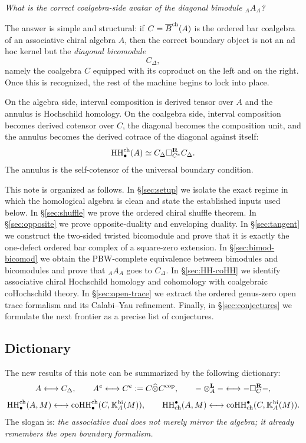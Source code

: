 \medskip

\emph{What is the correct coalgebra-side avatar of the diagonal bimodule ${}_A A_A$?}

\medskip

The answer is simple and structural:
if $C=\overline{B}^{\mathrm{ch}}(A)$ is the ordered bar coalgebra of an associative chiral algebra $A$, then the
correct boundary object is not an ad hoc kernel but the \emph{diagonal bicomodule}
\[
C_\Delta,
\]
namely the coalgebra $C$ equipped with its coproduct on the left and on the right. Once this is
recognized, the rest of the machine begins to lock into place.

On the algebra side, interval composition is derived tensor over $A$ and the annulus is Hochschild
homology. On the coalgebra side, interval composition becomes derived cotensor over $C$, the
diagonal becomes the composition unit, and the annulus becomes the derived cotrace of the diagonal
against itself:
\[
\operatorname{HH}^{\mathrm{ch}}_\bullet(A)\simeq C_\Delta \square_{C^e}^{\mathbf R} C_\Delta.
\]
The annulus is the self-cotensor of the universal boundary condition.

This note is organized as follows. In \S\ref{sec:setup} we isolate the exact regime in which the
homological algebra is clean and state the established inputs used below. In \S\ref{sec:shuffle} we
prove the ordered chiral shuffle theorem. In \S\ref{sec:opposite} we prove opposite-duality and
enveloping duality. In \S\ref{sec:tangent} we construct the two-sided twisted bicomodule and prove
that it is exactly the one-defect ordered bar complex of a square-zero extension. In
\S\ref{sec:bimod-bicomod} we obtain the PBW-complete equivalence between bimodules and bicomodules
and prove that ${}_A A_A$ goes to $C_\Delta$. In \S\ref{sec:HH-coHH} we identify associative chiral
Hochschild homology and cohomology with coalgebraic coHochschild theory. In
\S\ref{sec:open-trace} we extract the ordered genus-zero open trace formalism and its Calabi--Yau
refinement. Finally, in \S\ref{sec:conjectures} we formulate the next frontier as a precise list of
conjectures.

\subsection*{Dictionary}
The new results of this note can be summarized by the following dictionary:
\[
A \longleftrightarrow C_\Delta,\qquad
A^e \longleftrightarrow C^e:=C\widehat\otimes C^{\mathrm{cop}},\qquad
-\otimes_A^{\mathbf L}- \longleftrightarrow -\square_C^{\mathbf R}-,
\]
\[
\operatorname{HH}^{\mathrm{ch}}_\bullet(A,M)
\longleftrightarrow
\operatorname{coHH}^{\mathrm{ch}}_\bullet(C,\mathbb{K}_A^{\mathrm{bi}}(M)),
\qquad
\operatorname{HH}_{\mathrm{ch}}^\bullet(A,M)
\longleftrightarrow
\operatorname{coHH}_{\mathrm{ch}}^\bullet(C,\mathbb{K}_A^{\mathrm{bi}}(M)).
\]
The slogan is: \emph{the associative dual does not merely mirror the algebra; it already remembers
the open boundary formalism.}

